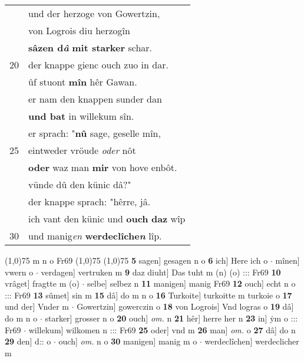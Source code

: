\documentclass[8pt,a4paper,notitlepage]{article}
\begin{document}
\begin{table}[ht]
\begin{minipage}[t]{0.5\linewidth}
\begin{tabular}{rl}
 & und der herzoge von Gowertzin,\\ 
 & von Logrois diu herzogîn\\ 
 & \textbf{sâzen d\textit{â}} \textbf{mit starker} schar.\\ 
20 & der knappe gienc ouch zuo in dar.\\ 
 & ûf stuont \textbf{mîn} hêr Gawan.\\ 
 & er nam den knappen sunder dan\\ 
 & \textbf{und bat} in willekum sîn.\\ 
 & er sprach: "\textbf{nû} sage, geselle mîn,\\ 
25 & eintweder vröude \textit{oder} nôt\\ 
 & \textbf{oder} waz man \textbf{mir} von hove enbôt.\\ 
 & vünde dû den künic dâ?"\\ 
 & der knappe sprach: "hêrre, jâ.\\ 
 & ich vant den künic und \textbf{ouch} \textbf{daz} wîp\\ 
30 & und manig\textit{en} \textbf{werdeclîche\textit{n}} lîp.\\ 
\end{tabular}
\scriptsize
\line(1,0){75} \newline
m n o Fr69 \newline
\line(1,0){75} \newline
\newline
\line(1,0){75} \newline
\textbf{5} sagen] gesagen n o \textbf{6} ich] Here ich o  $\cdot$ mînen] vwern o  $\cdot$ verdagen] vertruken m \textbf{9} daz diuht] Das tuht m (n) (o) ::: Fr69 \textbf{10} vrâget] fragtte m (o)  $\cdot$ selbe] selbez n \textbf{11} manigen] manig Fr69 \textbf{12} ouch] echt n o ::: Fr69 \textbf{13} sûmet] sin m \textbf{15} dâ] do m n o \textbf{16} Turkoite] turkoitte m turkoie o \textbf{17} und der] Vnder m  $\cdot$ Gowertzin] gowerczin o \textbf{18} von Logrois] Vnd logras o \textbf{19} dâ] do m n o  $\cdot$ starker] grosser n o \textbf{20} ouch] \textit{om.} n \textbf{21} hêr] herre her n \textbf{23} in] ẏm o ::: Fr69  $\cdot$ willekum] wilkomen n ::: Fr69 \textbf{25} oder] vnd m \textbf{26} man] \textit{om.} o \textbf{27} dâ] do n \textbf{29} den] d:: o  $\cdot$ ouch] \textit{om.} n o \textbf{30} manigen] manig m o  $\cdot$ werdeclîchen] werdeclicher m \newline
\end{minipage}
\end{table}
\newpage
\end{document}
